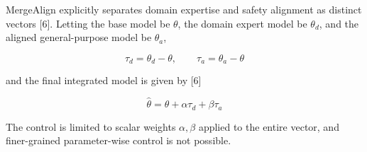 \documentclass{article}
\begin{document}













MergeAlign explicitly separates domain expertise and safety alignment as distinct vectors [6]. Letting the base model be $\theta$, the domain expert model be $\theta_d$, and the aligned general-purpose model be $\theta_a$,

\[
\tau_d=\theta_d-\theta,\qquad \tau_a=\theta_a-\theta
\tag{8}
\]

and the final integrated model is given by [6]

\[
\hat\theta=\theta+\alpha\tau_d+\beta\tau_a
\tag{9}
\]

The control is limited to scalar weights $\alpha, \beta$ applied to the entire vector, and finer-grained parameter-wise control is not possible.
\end{document}
